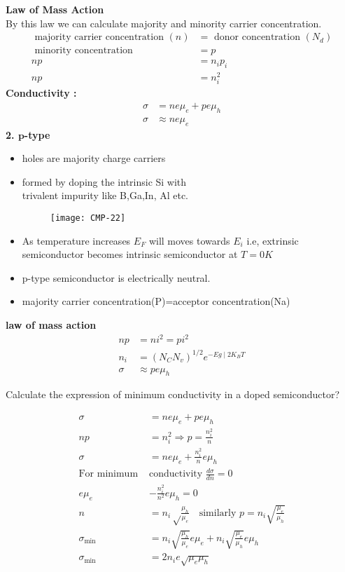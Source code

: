 \textbf{Law of Mass Action}\\
By this law we can calculate majority and minority carrier concentration.
\begin{align*}
\text { majority carrier concentration }(n)&=\text { donor concentration }\left(N_{d}\right)\\
\text { minority concentration}&= p\\
n p&=n_i p_{i}\\
n p&=n_i^{2}
\end{align*}
\textbf{Conductivity :}
\begin{align*}
\sigma&=n e \mu_{e}+p e \mu_{h} \\
\sigma &\approx n e \mu_{e}
\end{align*}
\textbf{2. $\mathbf{p}$-type} 
\begin{itemize}
	\item holes are majority charge carriers 
	\item formed by doping the intrinsic Si with\\
	trivalent impurity like B,Ga,In, Al etc.
	\begin{figure}[H]
		\centering
		\texttt{[image: CMP-22]}
		\caption{}
		\label{}
	\end{figure}
	\item As temperature increases $E_F$ will moves towards $E_i$
	i.e, extrinsic semiconductor becomes intrinsic semiconductor
	at $T=0K$
	\item p-type semiconductor is electrically neutral.
	\item majority carrier concentration(P)=acceptor concentration(Na)
\end{itemize}
\textbf{law of mass action}
\begin{align*}
n p&=n i^{2}=p i^{2}\\
n_{i}&=\left(N_{C} N_{v}\right)^{1 / 2} e^{-E g \mid 2 K_{B} T}\\
\sigma &\approx p e \mu_{h}
\end{align*}

\begin{exercise}
	Calculate the expression of minimum conductivity in a doped semiconductor?
\end{exercise}
\begin{answer}
	\begin{align*}
	\sigma&=n e \mu_{e}+p e \mu_{h}\\
	n p&=n_i^{2} \Rightarrow p=\frac{n_{i}^{2}}{n}\\
	\sigma&=n e \mu_{e}+\frac{n_{i}^{2}}{n} e \mu_{h}\\
	\text{For minimum }&\text{conductivity }\frac{d \sigma}{d n}=0\\
	e \mu_{e}&-\frac{n_{i}^{2}}{n^{2}} e \mu_{h}=0\\
	n&=n_{i}\sqrt\frac{\mu_h}{\mu_{e}}\quad\text{similarly }p=n_i \sqrt{\frac{\mu _e}{\mu_h}}\\
	\sigma_{\min }&=n_{i} \sqrt{\frac{\mu_{h}}{\mu_{e}}} e \mu_{e}+n_{i} \sqrt{\frac{\mu_{e}}{\mu_{h}}} e \mu_{h}\\
	\sigma_{\min }&=2 n_{i} e \sqrt{\mu_{e} \mu_{h}}
	\end{align*}
\end{answer}
